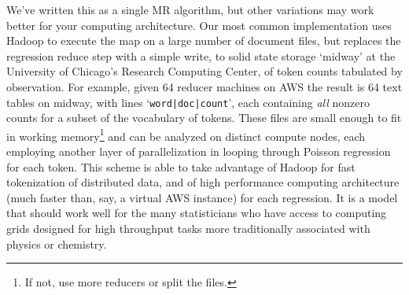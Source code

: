 \documentclass[12pt]{article}
\newcommand{\sgl}{\setstretch{1.1}}
\newcommand{\cd}[1]{{\tt#1}}
\begin{document}
We've written this as a single MR algorithm, but other variations may work better for your computing architecture. Our most common implementation uses Hadoop to execute the map on a large number of document files, but replaces the regression reduce step with a simple write, to solid state storage `midway' at the University of Chicago's Research Computing Center, of token counts tabulated by observation.  For example, given 64 reducer machines on AWS the result is 64 text tables on midway, with lines `\cd{word|doc|count}', each containing {\it all} nonzero counts for a subset of the vocabulary of tokens.  These files are small enough to fit in working memory\footnote{If not, use more reducers or split the files.} and can be analyzed on distinct compute nodes, each employing another layer of parallelization in looping through Poisson regression for each token.  This scheme is able to take advantage of Hadoop for fast tokenization of distributed data, and of
high performance computing architecture (much faster than, say, a virtual AWS instance) for each  regression.  It is a model that should work well for the many statisticians who have access to computing grids designed for high throughput tasks more traditionally associated with physics or chemistry.

\sgl\small


\end{document}
